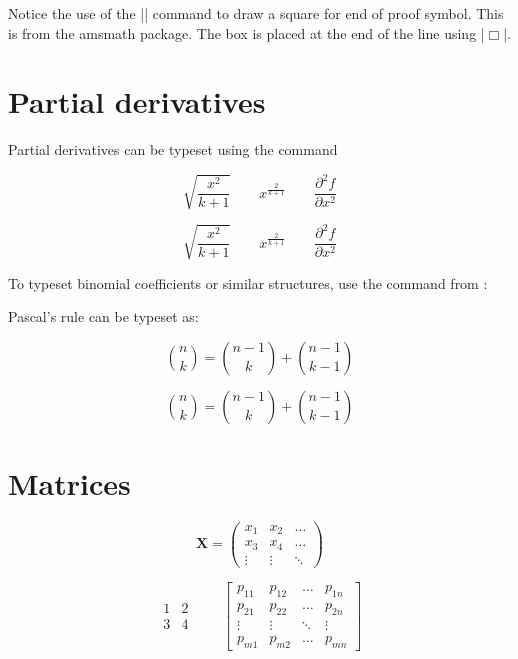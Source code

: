 Notice the use of the |\Box| command to draw a square for  end of proof symbol. This is from the amsmath package. The box is placed at the end of the line using |\hfill $\Box$|.



\section{Partial derivatives}

Partial derivatives can be typeset using the \latex{} command 
\begin{teXX}
\[
 \sqrt{\frac{x^2}{k+1}}\qquad
  x^\frac{2}{k+1}\qquad
  \frac{\partial^2f}
  {\partial x^2}
\]
\end{teXX}




\begin{equation*}
\sqrt{\frac{x^2}{k+1}}\qquad
x^\frac{2}{k+1}\qquad
\frac{\partial^2f}
{\partial x^2}
\end{equation*}



To typeset binomial coefficients or similar structures, use the command
 from :

Pascal's rule can be typeset as:

\begin{shaded}
\begin{teXX}
\[
\binom{n}{k} =\binom{n-1}{k}
+ \binom{n-1}{k-1}
\]
\end{teXX}
\[
\binom{n}{k} =\binom{n-1}{k}
+ \binom{n-1}{k-1}
\]
\end{shaded}

\clearpage




\section{Matrices}

\begin{equation*}
\mathbf{X} = \left(
\begin{array}{ccc}
x_1 & x_2 & \ldots \\
x_3 & x_4 & \ldots \\
\vdots & \vdots & \ddots
\end{array} \right)
\end{equation*}

\begin{equation*}
\begin{matrix}
1 & 2 \\
3 & 4
\end{matrix} \qquad
\begin{bmatrix}
p_{11} & p_{12} & \ldots
& p_{1n} \\
p_{21} & p_{22} & \ldots
& p_{2n} \\
\vdots & \vdots & \ddots
& \vdots \\
p_{m1} & p_{m2} & \ldots
& p_{mn}
\end{bmatrix}
\end{equation*}


